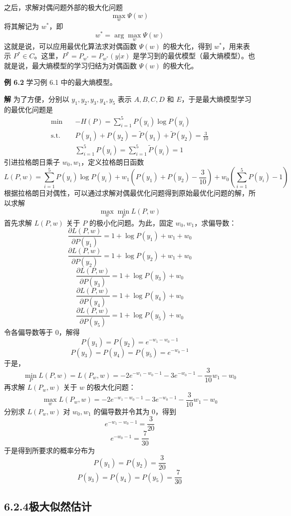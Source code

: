 \documentclass[UTF8, 12pt, fontset=fandol, oneside]{ctexart}
\begin{document}
之后，求解对偶问题外部的极大化问题
\begin{equation}
\max_w\Psi(w)
\tag{6.24}
\end{equation}
将其解记为 $w^*$，即
\begin{equation}
w^*=\arg\max_w\Psi(w)
\tag{6.25}
\end{equation}
这就是说，可以应用最优化算法求对偶函数 $\Psi(w)$ 的极大化，得到 $w^*$，用来表示 $P^*\in C$。这里，$P^*=P_{w^*}=P_{w^*}(y|x)$ 是学习到的最优模型（最大熵模型）。也就是说，最大熵模型的学习归结为对偶函数 $\Psi(w)$ 的极大化。

\noindent\textbf{例 6.2}\quad
学习例 6.1 中的最大熵模型。

\noindent\textbf{解}\quad
为了方便，分别以 $y_1,y_2,y_3,y_4,y_5$ 表示 $A,B,C,D$ 和 $E$，于是最大熵模型学习的最优化问题是
\[
\begin{aligned}
\min\quad &-H(P)=\sum_{i=1}^5 P(y_i)\log P(y_i)\\
\mathrm{s.t.}\quad &P(y_1)+P(y_2)=\tilde{P}(y_1)+\tilde{P}(y_2)=\frac{3}{10}\\
&\sum_{i=1}^5 P(y_i)=\sum_{i=1}^5\tilde{P}(y_i)=1
\end{aligned}
\]
引进拉格朗日乘子 $w_0,w_1$，定义拉格朗日函数
\[
L(P,w)=\sum_{i=1}^5P(y_i)\log P(y_i)+w_1\left(P(y_1)+P(y_2)-\frac{3}{10}\right)
+w_0\left(\sum_{i=1}^5P(y_i)-1\right)
\]
根据拉格朗日对偶性，可以通过求解对偶最优化问题得到原始最优化问题的解，所以求解
\[
\max_w\min_P L(P,w)
\]
首先求解 $L(P,w)$ 关于 $P$ 的极小化问题。为此，固定 $w_0,w_1$，求偏导数：
\[
\frac{\partial L(P,w)}{\partial P(y_1)}=1+\log P(y_1)+w_1+w_0
\]
\[
\frac{\partial L(P,w)}{\partial P(y_2)}=1+\log P(y_2)+w_1+w_0
\]
\[
\frac{\partial L(P,w)}{\partial P(y_3)}=1+\log P(y_3)+w_0
\]
\[
\frac{\partial L(P,w)}{\partial P(y_4)}=1+\log P(y_4)+w_0
\]
\[
\frac{\partial L(P,w)}{\partial P(y_5)}=1+\log P(y_5)+w_0
\]
令各偏导数等于 0，解得
\[
P(y_1)=P(y_2)=e^{-w_1-w_0-1}
\]
\[
P(y_3)=P(y_4)=P(y_5)=e^{-w_0-1}
\]
于是，
\[
\min_P L(P,w)=L(P_w,w)=-2e^{-w_1-w_0-1}-3e^{-w_0-1}-\frac{3}{10}w_1-w_0
\]
再求解 $L(P_w,w)$ 关于 $w$ 的极大化问题：
\[
\max_w L(P_w,w)=-2e^{-w_1-w_0-1}-3e^{-w_0-1}-\frac{3}{10}w_1-w_0
\]
分别求 $L(P_w,w)$ 对 $w_0,w_1$ 的偏导数并令其为 0，得到
\[
e^{-w_1-w_0-1}=\frac{3}{20}
\]
\[
e^{-w_0-1}=\frac{7}{30}
\]
于是得到所要求的概率分布为
\[
P(y_1)=P(y_2)=\frac{3}{20}
\]
\[
P(y_3)=P(y_4)=P(y_5)=\frac{7}{30}
\]

\subsection*{6.2.4\quad 极大似然估计}
\end{document}
